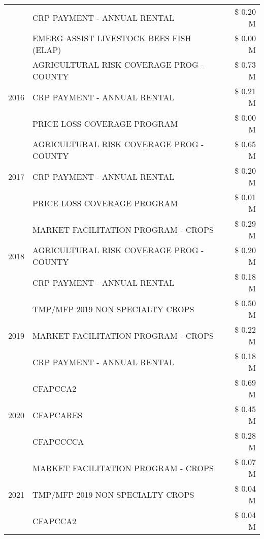 \begin{tabular}{llr}
 & CRP PAYMENT - ANNUAL RENTAL & \$ 0.20 M \\
 & EMERG ASSIST LIVESTOCK BEES FISH (ELAP) & \$ 0.00 M \\
\cline{1-3}
\multirow[t]{3}{*}{2016} & AGRICULTURAL RISK COVERAGE PROG - COUNTY & \$ 0.73 M \\
 & CRP PAYMENT - ANNUAL RENTAL & \$ 0.21 M \\
 & PRICE LOSS COVERAGE PROGRAM & \$ 0.00 M \\
\cline{1-3}
\multirow[t]{3}{*}{2017} & AGRICULTURAL RISK COVERAGE PROG - COUNTY & \$ 0.65 M \\
 & CRP PAYMENT - ANNUAL RENTAL & \$ 0.20 M \\
 & PRICE LOSS COVERAGE PROGRAM & \$ 0.01 M \\
\cline{1-3}
\multirow[t]{3}{*}{2018} & MARKET FACILITATION PROGRAM - CROPS & \$ 0.29 M \\
 & AGRICULTURAL RISK COVERAGE PROG - COUNTY & \$ 0.20 M \\
 & CRP PAYMENT - ANNUAL RENTAL & \$ 0.18 M \\
\cline{1-3}
\multirow[t]{3}{*}{2019} & TMP/MFP 2019 NON SPECIALTY CROPS & \$ 0.50 M \\
 & MARKET FACILITATION PROGRAM - CROPS & \$ 0.22 M \\
 & CRP PAYMENT - ANNUAL RENTAL & \$ 0.18 M \\
\cline{1-3}
\multirow[t]{3}{*}{2020} & CFAPCCA2 & \$ 0.69 M \\
 & CFAPCARES & \$ 0.45 M \\
 & CFAPCCCCA & \$ 0.28 M \\
\cline{1-3}
\multirow[t]{3}{*}{2021} & MARKET FACILITATION PROGRAM - CROPS & \$ 0.07 M \\
 & TMP/MFP 2019 NON SPECIALTY CROPS & \$ 0.04 M \\
 & CFAPCCA2 & \$ 0.04 M \\
\cline{1-3}
\bottomrule
\end{tabular}
